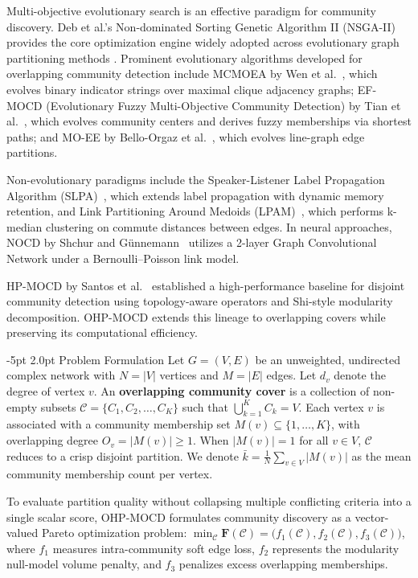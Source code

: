 \documentclass{svproc}
\makeatletter
\renewcommand\section{\@startsection{section}{1}{\z@}%
  {-5pt \@plus -1pt \@minus -0.5pt}%
  {2.0pt \@plus 0.5pt}%
  {\normalfont\large\bfseries\boldmath}}
\makeatother
\begin{document}
Multi-objective evolutionary search is an effective paradigm for community discovery. Deb et al.'s Non-dominated Sorting Genetic Algorithm II (NSGA-II)~\cite{deb2002} provides the core optimization engine widely adopted across evolutionary graph partitioning methods \cite{pizzuti2012}. Prominent evolutionary algorithms developed for overlapping community detection include MCMOEA by Wen et al.~\cite{wen2016}, which evolves binary indicator strings over maximal clique adjacency graphs; EF-MOCD (Evolutionary Fuzzy Multi-Objective Community Detection) by Tian et al.~\cite{tian2020}, which evolves community centers and derives fuzzy memberships via shortest paths; and MO-EE by Bello-Orgaz et al.~\cite{bello2018}, which evolves line-graph edge partitions.

Non-evolutionary paradigms include the Speaker-Listener Label Propagation Algorithm (SLPA)~\cite{xie2011}, which extends label propagation with dynamic memory retention, and Link Partitioning Around Medoids (LPAM)~\cite{ponomarenko2021}, which performs k-median clustering on commute distances between edges. In neural approaches, NOCD by Shchur and G{\"u}nnemann~\cite{shchur2019} utilizes a 2-layer Graph Convolutional Network under a Bernoulli--Poisson link model.

HP-MOCD by Santos et al.~\cite{santos2025} established a high-performance baseline for disjoint community detection using topology-aware operators and Shi-style modularity decomposition. OHP-MOCD extends this lineage to overlapping covers while preserving its computational efficiency.

\section{Problem Formulation}\label{sec:problem}
Let $G = (V, E)$ be an unweighted, undirected complex network with $N = |V|$ vertices and $M = |E|$ edges. Let $d_v$ denote the degree of vertex $v$. An \textbf{overlapping community cover} is a collection of non-empty subsets $\mathcal{C} = \{C_1, C_2, \dots, C_K\}$ such that $\bigcup_{k=1}^K C_k = V$. Each vertex $v$ is associated with a community membership set $M(v) \subseteq \{1, \dots, K\}$, with overlapping degree $O_v = |M(v)| \ge 1$. When $|M(v)| = 1$ for all $v \in V$, $\mathcal{C}$ reduces to a crisp disjoint partition. We denote $\bar{k} = \frac{1}{N}\sum_{v \in V} |M(v)|$ as the mean community membership count per vertex.

To evaluate partition quality without collapsing multiple conflicting criteria into a single scalar score, OHP-MOCD formulates community discovery as a vector-valued Pareto optimization problem: $\min_{\mathcal{C}} \mathbf{F}(\mathcal{C}) = \big( f_1(\mathcal{C}), f_2(\mathcal{C}), f_3(\mathcal{C}) \Big)$, where $f_1$ measures intra-community soft edge loss, $f_2$ represents the modularity null-model volume penalty, and $f_3$ penalizes excess overlapping memberships.
\end{document}
